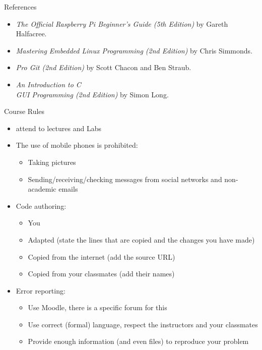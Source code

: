 \begin{frame}{References}
  \begin{itemize}
    \item \textit{The Official Raspberry Pi Beginner’s Guide (5th Edition)} by Gareth Halfacree.
    \item \textit{Mastering Embedded Linux Programming (2nd Edition)} by Chris Simmonds.
    \item \textit{Pro Git (2nd Edition)} by Scott Chacon and Ben Straub.
    \item \textit{An Introduction to C \\ GUI Programming (2nd Edition)} by Simon Long.
  \end{itemize}
\end{frame}

\begin{frame}{Course Rules}
\begin{itemize}
    \item attend to lectures and Labs
    \item The use of mobile phones is prohibited: \begin{itemize}
        \item Taking pictures
        \item Sending/receiving/checking messages from social networks and non-academic emails
    \end{itemize}
    \item Code authoring:
    \begin{itemize}
        \item You
        \item Adapted (state the lines that are copied and the changes you have made)
        \item Copied from the internet (add the source URL)
        \item Copied from your classmates (add their names)
    \end{itemize}
    \item Error reporting:
    \begin{itemize}
        \item Use Moodle, there is a specific forum for this
        \item Use correct (formal) language, respect the instructors and your classmates
        \item Provide enough information (and even files) to reproduce your problem
    \end{itemize}
\end{itemize}
\end{frame}